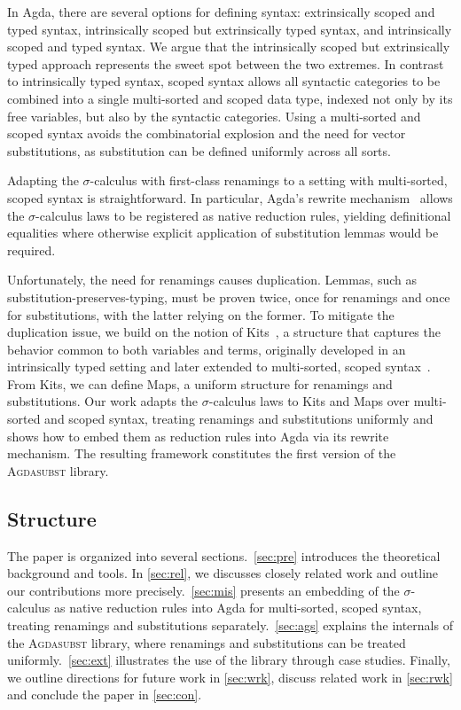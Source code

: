 \documentclass[screen,nonacm]{acmart}
\begin{document}
In Agda, there are several options for defining syntax: extrinsically scoped
and typed syntax, intrinsically scoped but extrinsically typed syntax, and
intrinsically scoped and typed syntax. We argue that the intrinsically scoped
but extrinsically typed approach represents the sweet spot between the two
extremes. In contrast to intrinsically typed syntax, scoped syntax allows all
syntactic categories to be combined into a single multi-sorted and scoped data
type, indexed not only by its free variables, but also by the syntactic
categories. Using a multi-sorted and scoped syntax avoids the combinatorial
explosion and the need for vector substitutions, as substitution can be defined
uniformly across all sorts.

Adapting the $σ$-calculus with first-class renamings to a setting with
multi-sorted, scoped syntax is straightforward. In particular, Agda’s rewrite
mechanism~\cite{10.1145/3434341} allows the $σ$-calculus laws to be registered
as native reduction rules, yielding definitional equalities where otherwise
explicit application of substitution lemmas would be required.

Unfortunately, the need for renamings causes duplication. Lemmas, such as
substitution-preserves-typing, must be proven twice, once for renamings and
once for substitutions, with the latter relying on the former. To mitigate the
duplication issue, we build on the notion of Kits~\cite{ren-sub}, a structure
that captures the behavior common to both variables and terms, originally
developed in an intrinsically typed setting and later extended to multi-sorted,
scoped syntax~\cite{saffrich:LIPIcs.ITP.2024.32}. From Kits, we can define
Maps, a uniform structure for renamings and substitutions. Our work adapts the
$σ$-calculus laws to Kits and Maps over multi-sorted and scoped syntax,
treating renamings and substitutions uniformly and shows how to embed them as
reduction rules into Agda via its rewrite mechanism. The resulting framework
constitutes the first version of the \textsc{Agdasubst} library.

\subsection*{Structure}
The paper is organized into several sections.\ \cref{sec:pre} introduces the
theoretical background and tools. In \cref{sec:rel}, we discusses closely
related work and outline our contributions more precisely.\ \cref{sec:mis}
presents an embedding of the $σ$-calculus as native reduction rules into Agda
for multi-sorted, scoped syntax, treating renamings and substitutions
separately.\ \cref{sec:ags} explains the internals of the \textsc{Agdasubst}
library, where renamings and substitutions can be treated uniformly.\
\cref{sec:ext} illustrates the use of the library through case studies.
Finally, we outline directions for future work in \cref{sec:wrk}, discuss
related work in \cref{sec:rwk} and conclude the paper in \cref{sec:con}.
\end{document}
